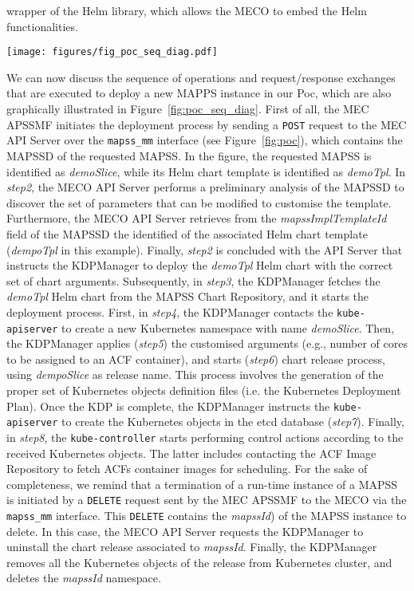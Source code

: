 wrapper of the Helm library, which allows the MECO to embed the Helm functionalities.   

%
\begin{figure*}[ht]
    \centering
    \texttt{[image: figures/fig\_poc\_seq\_diag.pdf]}
   \caption{Sequence of operations to instantiate a new MAPSS in the PoC architecture.}
    \label{fig:poc_seq_diag}
\end{figure*}
%
We can now discuss the sequence of operations and request/response exchanges that are executed to deploy a new MAPPS instance in our Poc, which are also graphically illustrated in Figure~\ref{fig:poc_seq_diag}. First of all, the MEC APSSMF initiates the deployment process by sending a \texttt{POST} request to the MEC API Server over the \texttt{mapss\_mm} interface (see Figure~\ref{fig:poc}), which contains the MAPSSD of the requested MAPSS. In the figure, the requested MAPSS is identified as \textit{demoSlice}, while its Helm chart template is identified as \textit{demoTpl}. In \textit{step2}, the MECO API Server performs a preliminary analysis of the MAPSSD to discover the set of parameters that can be modified to customise the template. Furthermore, the MECO API Server retrieves from the \textit{mapssImplTemplateId} field of the MAPSSD the identified of the associated Helm chart template (\textit{dempoTpl} in this example). Finally, \textit{step2} is concluded with the API Server that instructs the KDPManager to deploy the \textit{demoTpl} Helm chart with the correct set of chart arguments. Subsequently, in \textit{step3}, the KDPManager fetches the \textit{demoTpl} Helm chart from the MAPSS Chart Repository, and it starts the deployment process. First, in \textit{step4}, the KDPManager contacts the \texttt{kube-apiserver} to create a new Kubernetes namespace with name \textit{demoSlice}. Then, the KDPManager applies (\textit{step5}) the customised arguments (e.g., number of cores to be assigned to an ACF container), and starts (\textit{step6}) chart release process, using \textit{dempoSlice} as release name. This process involves the generation of the proper set of Kubernetes objects definition files (i.e. the Kubernetes Deployment Plan). Once the KDP is complete, the KDPManager instructs the \texttt{kube-apiserver} to create the Kubernetes objects in the etcd database (\textit{step7}). Finally, in \textit{step8}, the \texttt{kube-controller} starts performing control actions according to the received Kubernetes objects. The latter includes contacting the ACF Image Repository to fetch ACFs container images for scheduling. For the sake of completeness, we remind that a termination of a run-time instance of a MAPSS is initiated by a \texttt{DELETE} request sent by the MEC APSSMF to the MECO via the \texttt{mapss\_mm} interface. This \texttt{DELETE} contains the \textit{mapssId}) of the MAPSS instance to delete. In this case, the MECO API Server requests the KDPManager to uninstall the chart release associated to \textit{mapssId}. Finally, the KDPManager removes all the Kubernetes objects of the release from Kubernetes cluster, and deletes the \textit{mapssId} namespace.

